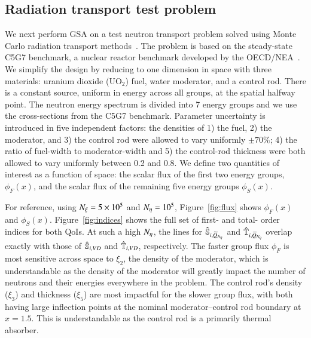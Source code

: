 \subsection{Radiation transport test problem}
We next perform GSA on a test neutron transport problem solved using Monte Carlo radiation transport methods~\cite{lux-koblinger-90}. 
The problem is based on the steady-state C5G7 benchmark, a nuclear reactor benchmark developed by the OECD/NEA~\cite{c5g7-2005}. 
We simplify the design by reducing to one dimension in space with three materials: uranium dioxide (UO$_2$) fuel, water moderator, and a control rod. 
There is a constant source, uniform in energy across all groups, at the spatial halfway point.
The neutron energy spectrum is divided into 7 energy groups and we use the cross-sections from the C5G7 benchmark.
Parameter uncertainty is introduced in five independent factors: the densities of 1) the fuel, 2) the moderator, and 3) the control rod were allowed to vary uniformly $\pm 70\%$; 4) the ratio of fuel-width to moderator-width and 5) the control-rod thickness were both allowed to vary uniformly between 0.2 and 0.8. 
We define two quantities of interest as a function of space: the scalar flux of the first two energy groups, $\phi_F (x)$, and the scalar flux of the remaining five energy groups $\phi_S(x)$.

For reference, using ${N_\xi}=5 \times 10^5$ and ${N_\eta}=10^5$, Figure~\ref{fig:flux} shows $\phi_F (x)$ and $\phi_S (x)$. Figure~\ref{fig:indices} shows the full set of first- and total- order indices for both QoIs.
At such a high ${N_\eta}$, the lines for $\hat{\mathbb{S}}_{i, \widetilde{Q}_{{N_\eta}}}$ and $\hat{\mathbb{T}}_{i, \widetilde{Q}_{{N_\eta}}}$ overlap exactly with those of $\hat{\mathbb{S}}_{i, VD}$ and $\hat{\mathbb{T}}_{i, VD}$, respectively.
The faster group flux $\phi_F$ is most sensitive across space to $\xi_2$, the density of the moderator, which is understandable as the density of the moderator will greatly impact the number of neutrons and their energies everywhere in the problem. 
The control rod's density ($\xi_3$) and thickness ($\xi_5$) are most impactful for the slower group flux, with both having large inflection points at the nominal moderator--control rod boundary at $x=1.5$.
This is understandable as the control rod is a primarily thermal absorber.

